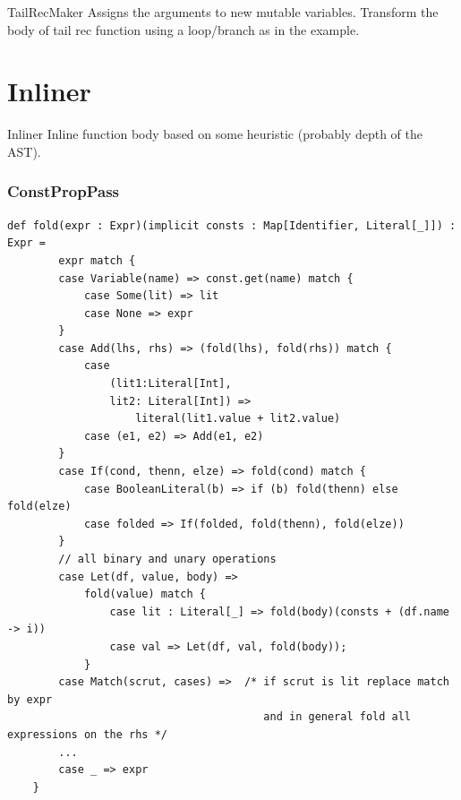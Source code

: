 \documentclass{beamer}
\begin{document}
\begin{frame}{TailRecMaker}
    Assigns the arguments to new mutable variables.
    Transform the body of tail rec function using a loop/branch as in the example.
\end{frame}

\section{Inliner}
\begin{frame}{Inliner}
    Inline function body based on some heuristic (probably depth of the AST). 
\end{frame}

\begin{frame}[fragile]
\frametitle{ConstPropPass}
\begin{lstlisting}[basicstyle=\tiny\ttfamily]
    def fold(expr : Expr)(implicit consts : Map[Identifier, Literal[_]]) : Expr = 
        expr match {
        case Variable(name) => const.get(name) match {
            case Some(lit) => lit
            case None => expr
        }
        case Add(lhs, rhs) => (fold(lhs), fold(rhs)) match {
            case 
                (lit1:Literal[Int], 
                lit2: Literal[Int]) => 
                    literal(lit1.value + lit2.value)
            case (e1, e2) => Add(e1, e2)
        }
        case If(cond, thenn, elze) => fold(cond) match {
            case BooleanLiteral(b) => if (b) fold(thenn) else fold(elze)
            case folded => If(folded, fold(thenn), fold(elze))
        }
        // all binary and unary operations
        case Let(df, value, body) => 
            fold(value) match {
                case lit : Literal[_] => fold(body)(consts + (df.name -> i))
                case val => Let(df, val, fold(body));
            }
        case Match(scrut, cases) =>  /* if scrut is lit replace match by expr
                                        and in general fold all expressions on the rhs */
        ...
        case _ => expr
    }
\end{lstlisting}
\end{frame}
\end{document}

